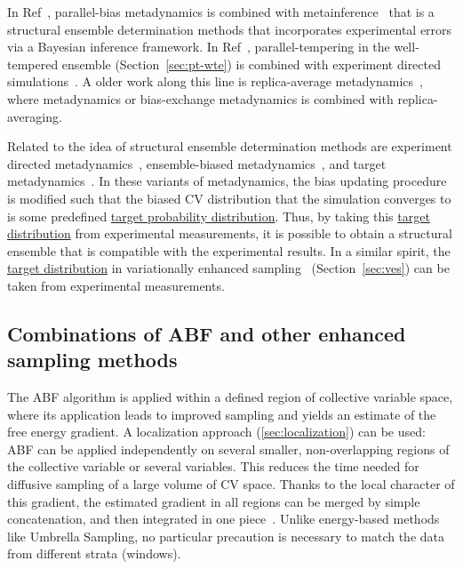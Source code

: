 \documentclass[9pt,review]{livecoms}
\begin{document}
In Ref~\cite{Bonomi_MetadynamicMetainference_SciRep2016}, parallel-bias metadynamics is combined with metainference~\cite{Bonomi_Metainference_SciAdv2016} that is a structural ensemble determination methods that incorporates experimental errors via a Bayesian inference framework. In Ref~\cite{Amirkulova_PTWTE-EDS_JPCB2020}, parallel-tempering in the well-tempered ensemble (Section~\ref{sec:pt-wte}) is combined with experiment directed simulations~\cite{White_EDS_JCTC2014}.
A older work along this line is replica-average metadynamics~\cite{Camilloni_RAM_2013,Camilloni_RAM-2_JACS20214}, where metadynamics or bias-exchange metadynamics is combined with replica-averaging.

Related to the idea of structural ensemble determination methods are experiment directed metadynamics~\cite{White_EDM_2015}, ensemble-biased metadynamics~\cite{Marinelli_EnsembleBiased_2015}, and target metadynamics~\cite{GilLey_TargetMetaD_2016}. In these variants of metadynamics, the bias updating procedure is modified such that the biased CV distribution that the simulation converges to is some predefined \hyperlink{ref:targetdist}{target probability distribution}. Thus, by taking this \hyperlink{ref:targetdist}{target distribution} from experimental measurements, it is possible to obtain a structural ensemble that is compatible with the experimental results. In a similar spirit, the \hyperlink{ref:targetdist}{target distribution} in variationally enhanced sampling~\cite{Valsson_VES_PRL_2014,Valsson2020Handbook_VES} (Section~\ref{sec:ves}) can be taken from experimental measurements.

\subsection{Combinations of ABF and other enhanced sampling methods}
\label{sec:abf_hybrids}

The ABF algorithm is applied within a defined region of collective variable space, where its application leads to improved sampling and yields an estimate of the free energy gradient. A localization approach (\ref{sec:localization}) can be used: ABF can be applied independently on several smaller, non-overlapping regions of the collective variable\cite{Chipot2005} or several variables\cite{Henin2010a}. This reduces the time needed for diffusive sampling of a large volume of CV space. Thanks to the local character of this gradient, the estimated gradient in all regions can be merged by simple concatenation, and then integrated in one piece~\cite{Henin2021integration}. Unlike energy-based methods like Umbrella Sampling, no particular precaution is necessary to match the data from different strata (windows).
\end{document}

